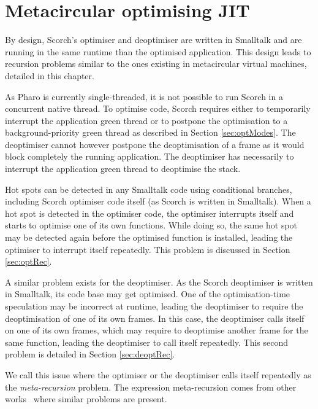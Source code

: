 \documentclass[a4paper,12pt,twoside]{../includes/ThesisStyle}
\begin{document}
\fi

\chapter{Metacircular optimising JIT}
\label{chap:metacircular}
\minitoc

By design, Scorch's optimiser and deoptimiser are written in Smalltalk and are running in the same runtime than the optimised application. This design leads to recursion problems similar to the ones existing in metacircular virtual machines, detailed in this chapter. 

As Pharo is currently single-threaded, it is not possible to run Scorch in a concurrent native thread. To optimise code, Scorch requires either to temporarily interrupt the application green thread or to postpone the optimisation to a background-priority green thread as described in Section \ref{sec:optModes}. The deoptimiser cannot however postpone the deoptimisation of a frame as it would block completely the running application. The deoptimiser has necessarily to interrupt the application green thread to deoptimise the stack.

Hot spots can be detected in any Smalltalk code using conditional branches, including Scorch optimiser code itself (as Scorch is written in Smalltalk). When a hot spot is detected in the optimiser code, the optimiser interrupts itself and starts to optimise one of its own functions. While doing so, the same hot spot may be detected again before the optimised function is installed, leading the optimiser to interrupt itself repeatedly. This problem is discussed in Section \ref{sec:optRec}.

A similar problem exists for the deoptimiser. As the Scorch deoptimiser is written in Smalltalk, its code base may get optimised. One of the optimisation-time speculation may be incorrect at runtime, leading the deoptimiser to require the deoptimisation of one of its own frames. In this case, the deoptimiser calls itself on one of its own frames, which may require to deoptimise another frame for the same function, leading the deoptimiser to call itself repeatedly. This second problem is detailed in Section \ref{sec:deoptRec}.

We call this issue where the optimiser or the deoptimiser calls itself repeatedly as the \emph{meta-recursion} problem. The expression meta-recursion comes from other works~\cite{Chib96a,Denk08b} where similar problems are present.
\end{document}
